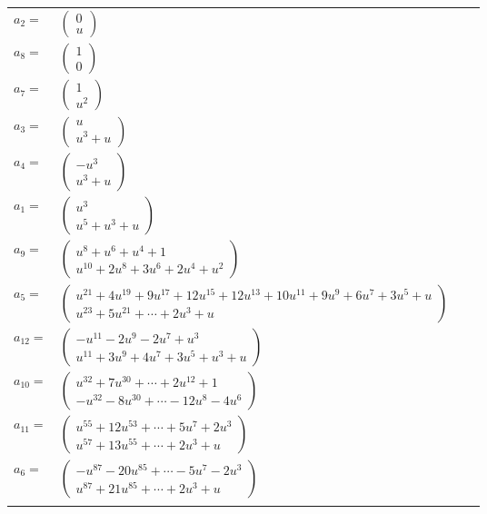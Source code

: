 \documentclass[1p]{elsarticle_modified}
\theoremstyle{definition}
\begin{document}
\begin{tabular}{m{7pt} m{180pt} m{7pt} m{180pt} }
\flushright $a_{2}=$&$\begin{pmatrix}0\\u\end{pmatrix}$ \\
\flushright $a_{8}=$&$\begin{pmatrix}1\\0\end{pmatrix}$ \\
\flushright $a_{7}=$&$\begin{pmatrix}1\\u^2\end{pmatrix}$ \\
\flushright $a_{3}=$&$\begin{pmatrix}u\\u^3+u\end{pmatrix}$ \\
\flushright $a_{4}=$&$\begin{pmatrix}- u^3\\u^3+u\end{pmatrix}$ \\
\flushright $a_{1}=$&$\begin{pmatrix}u^3\\u^5+u^3+u\end{pmatrix}$ \\
\flushright $a_{9}=$&$\begin{pmatrix}u^8+u^6+u^4+1\\u^{10}+2 u^8+3 u^6+2 u^4+u^2\end{pmatrix}$ \\
\flushright $a_{5}=$&$\begin{pmatrix}u^{21}+4 u^{19}+9 u^{17}+12 u^{15}+12 u^{13}+10 u^{11}+9 u^9+6 u^7+3 u^5+u\\u^{23}+5 u^{21}+\cdots+2 u^3+u\end{pmatrix}$ \\
\flushright $a_{12}=$&$\begin{pmatrix}- u^{11}-2 u^9-2 u^7+u^3\\u^{11}+3 u^9+4 u^7+3 u^5+u^3+u\end{pmatrix}$ \\
\flushright $a_{10}=$&$\begin{pmatrix}u^{32}+7 u^{30}+\cdots+2 u^{12}+1\\- u^{32}-8 u^{30}+\cdots-12 u^8-4 u^6\end{pmatrix}$ \\
\flushright $a_{11}=$&$\begin{pmatrix}u^{55}+12 u^{53}+\cdots+5 u^7+2 u^3\\u^{57}+13 u^{55}+\cdots+2 u^3+u\end{pmatrix}$ \\
\flushright $a_{6}=$&$\begin{pmatrix}- u^{87}-20 u^{85}+\cdots-5 u^7-2 u^3\\u^{87}+21 u^{85}+\cdots+2 u^3+u\end{pmatrix}$\\&\end{tabular}
\end{document}
